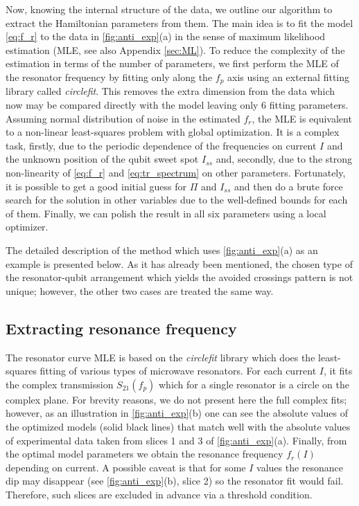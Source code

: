 \documentclass[%
 aip,
 draft,
 amsmath,amssymb,
 reprint,%
]{revtex4-1}
\begin{document}
Now, knowing the internal structure of the data, we outline our algorithm to extract the Hamiltonian parameters from them. The main idea is to fit the model \eqref{eq:f_r} to the data in \autoref{fig:anti_exp}(a) in the sense of maximum likelihood estimation\cite{bishop2006} (MLE, see also Appendix \ref{sec:ML}). To reduce the complexity of the estimation in terms of the number of parameters, we first perform the MLE of the resonator frequency by fitting only along the $f_p$ axis using an external fitting library called \textit{circlefit}\cite{probst2015}. This removes the extra dimension from the data which now may be compared directly with the model leaving only 6 fitting parameters. Assuming normal distribution of noise in the estimated $f_r$, the MLE is equivalent to a non-linear least-squares problem with global optimization. It is a complex task, firstly, due to the periodic dependence of the frequencies on current $I$ and the unknown position of the qubit sweet spot $I_{ss}$ and, secondly, due to the strong non-linearity of \eqref{eq:f_r} and \eqref{eq:tr_spectrum} on other parameters. Fortunately, it is possible to get a good initial guess for $\Pi$ and $I_{ss}$ and then do a brute force search for the solution in other variables due to the well-defined bounds for each of them. Finally, we can polish the result in all six parameters using a local optimizer.

The detailed description of the method which uses \autoref{fig:anti_exp}(a) as an example is presented below. As it has already been mentioned, the chosen type of the resonator-qubit arrangement which yields the avoided crossings pattern is not unique; however, the other two cases are treated the same way.

\subsection{Extracting resonance frequency}\label{sec:extract_fr}

The resonator curve MLE is based on the \textit{circlefit} library which does the least-squares fitting of various types of microwave resonators. For each current $I$, it fits the complex transmission $S_{21}(f_p)$ which for a single resonator is a circle on the complex plane\cite{probst2015}. For brevity reasons, we do not present here the full complex fits; however, as an illustration in \autoref{fig:anti_exp}(b) one can see the absolute values of the optimized models (solid black lines) that match well with the absolute values of experimental data taken from slices 1 and 3 of \autoref{fig:anti_exp}(a). Finally, from the optimal model parameters we obtain the resonance frequency $f_r(I)$ depending on current. A possible caveat is that for some $I$ values the resonance dip may disappear (see \autoref{fig:anti_exp}(b), slice 2) so the resonator fit would fail. Therefore, such slices are excluded in advance via a threshold condition.
\end{document}
